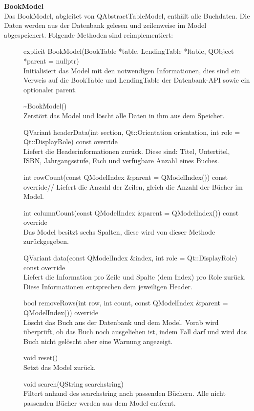 \textbf{BookModel}\\
Das BookModel, abgleitet von QAbstractTableModel, enthält alle Buchdaten. Die Daten werden aus der Datenbank gelesen und zeilenweise im Model abgespeichert. Folgende Methoden sind reimplementiert:
\begin{description}
	\item[ ] explicit BookModel(BookTable *table, LendingTable *ltable, QObject *parent = nullptr)\\
	Initialisiert das Model mit den notwendigen Informationen, dies sind ein Verweis auf die BookTable und LendingTable der Datenbank-API sowie ein optionaler parent.
  \item[ ] \~{}BookModel()\\
	Zerstört das Model und löscht alle Daten in ihm aus dem Speicher.
  \item[ ] QVariant headerData(int section, Qt::Orientation orientation, int role = Qt::DisplayRole) const override\\
	Liefert die Headerinformationen zurück. Diese sind: Titel, Untertitel, ISBN, Jahrgangsstufe, Fach und verfügbare Anzahl eines Buches.
  \item[ ] int rowCount(const QModelIndex \&parent = QModelIndex()) const override//
	Liefert die Anzahl der Zeilen, gleich die Anzahl der Bücher im Model.
  \item[ ] int columnCount(const QModelIndex \&parent = QModelIndex()) const override\\
	Das Model besitzt sechs Spalten, diese wird von dieser Methode zurückgegeben.
  \item[ ] QVariant data(const QModelIndex \&index, int role = Qt::DisplayRole) const override\\
	Liefert die Information pro Zeile und Spalte (dem Index) pro Role zurück. Diese Informationen entsprechen dem jeweiligen Header.
  \item[ ] bool removeRows(int row, int count, const QModelIndex \&parent = QModelIndex()) override\\
	Löscht das Buch aus der Datenbank und dem Model. Vorab wird überprüft, ob das Buch noch ausgeliehen ist, indem Fall darf und wird das Buch nicht gelöscht aber eine Warnung angezeigt.
  \item[ ] void reset()\\
	Setzt das Model zurück.
  \item[ ] void search(QString searchstring)\\
  Filtert anhand des searchstring nach passenden Büchern. Alle nicht passenden Bücher werden aus dem Model entfernt.

\end{description}

